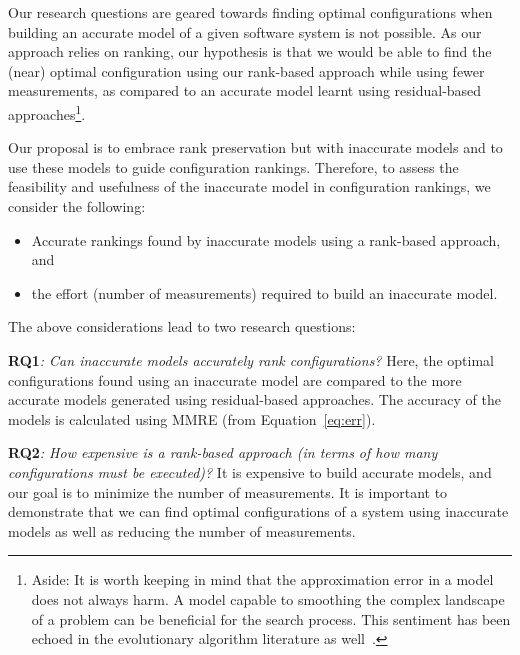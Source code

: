 Our research questions are geared towards finding optimal configurations when building an accurate model of a given software system is not possible. As our approach relies on ranking, our hypothesis is that we would be able to find the (near) optimal configuration  using our rank-based approach while using fewer measurements, as compared to an accurate model learnt using  residual-based approaches\footnote{Aside: It is worth keeping in mind that the approximation error in a model does not always harm. A model capable to smoothing the complex landscape of a problem can be beneficial for the search process. This sentiment has been echoed in the evolutionary algorithm literature as well~\cite{lim2010generalizing}.}.

Our proposal is to embrace rank preservation but with inaccurate models and to use these models to guide configuration rankings. Therefore, to assess the feasibility and usefulness of the inaccurate model in configuration rankings, we consider the following:
\begin{itemize}
    \item Accurate rankings found by inaccurate models using a rank-based approach, and
    \item the effort (number of measurements) required to build an inaccurate model. 
\end{itemize}
The above considerations lead to  two research questions:

 
  
 
\textbf{RQ1}\textit{: Can  inaccurate    models accurately rank
configurations?}
Here, the optimal configurations found using an inaccurate model are compared to the more accurate models generated using residual-based approaches. The accuracy of the models is calculated using MMRE (from Equation~\ref{eq:err}). 


\textbf{RQ2}\textit{: How expensive is a rank-based approach (in terms of
 how many configurations must be executed)?}
It is expensive to build accurate models, and our goal is to minimize the number of measurements. It is important to demonstrate that we can find optimal configurations of a system using inaccurate models as well as reducing the number of measurements.

